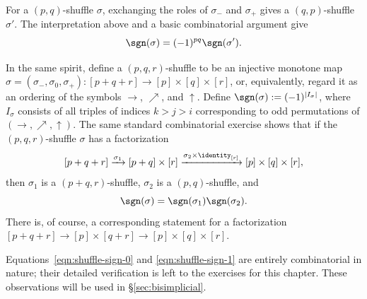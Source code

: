 For a $(p,q)$-shuffle $\sigma$, exchanging the roles of $\sigma_-$ and
$\sigma_+$ gives a $(q,p)$-shuffle $\sigma'$. The interpretation above and a
basic combinatorial argument give
\begin{equation}\label{eqn:shuffle-sign-0}
	\sgn(\sigma) = (-1)^{pq} \sgn(\sigma').
\end{equation}

In the same spirit, define a $(p,q,r)$-shuffle to be an injective monotone map
$\sigma=(\sigma_-,\sigma_0,\sigma_+):[p+q+r]\to[p]\times[q]\times[r]$, or,
equivalently, regard it as an ordering of the symbols $\rightarrow$,
$\nearrow$, and $\uparrow$. Define $\sgn(\sigma):=(-1)^{|I_\sigma|}$, where
$I_\sigma$ consists of all triples of indices $k>j>i$ corresponding to odd
permutations of $(\rightarrow,\nearrow,\uparrow)$. The same standard
combinatorial exercise shows that if the $(p,q,r)$-shuffle $\sigma$ has a
factorization
\[ [p+q+r] \xrightarrow{\sigma_1} [p+q] \times [r] \xrightarrow{\sigma_2 \times \identity_{[r]}} [p] \times [q] \times [r], \]
then $\sigma_1$ is a $(p+q,r)$-shuffle, $\sigma_2$ is a $(p,q)$-shuffle, and
\begin{equation}\label{eqn:shuffle-sign-1}
	\sgn(\sigma) = \sgn(\sigma_1) \sgn(\sigma_2).
\end{equation}
There is, of course, a corresponding statement for a factorization
$[p+q+r]\to[p]\times[q+r]\to[p]\times[q]\times[r]$.

Equations~\eqref{eqn:shuffle-sign-0} and \eqref{eqn:shuffle-sign-1} are
entirely combinatorial in nature; their detailed verification is left to the
exercises for this chapter. These observations will be used in
\S\ref{sec:bisimplicial}.

